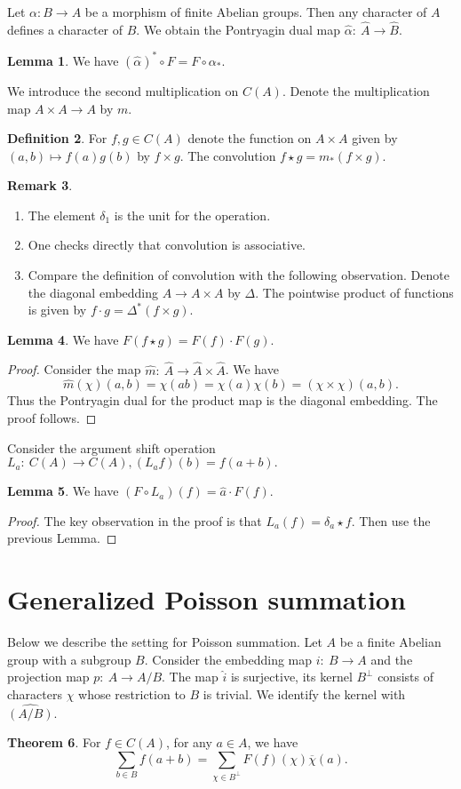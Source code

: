 \documentclass[11pt]{amsart}
\theoremstyle{definition}
\newtheorem{defi}{Definition}[section]
\newtheorem{rem}[defi]{Remark}
\newtheorem{lem}[defi]{Lemma}
\newtheorem{theo}[defi]{Theorem}
\begin{document}
Let $\alpha: B\to A$ be a morphism of finite Abelian groups. Then any character of $A$ defines a character of $B$. We obtain the Pontryagin dual map $\hat{\alpha}:\ \hat{A}\to \hat{B}$.
\begin{lem} We have $(\hat{\alpha})^*\circ F=F\circ \alpha_*$.
\end{lem}
We introduce the second multiplication on $C(A)$. Denote the multiplication map $A\times A\to A$ by $m$.
\begin{defi} For $f,g \in C(A)$ denote the function on $A\times A$ given by $(a,b)\mapsto f(a)g(b)$ by $f\times g$. The convolution $f\star g=m_*(f\times g)$.
\end{defi}
\begin{rem} 
\begin{enumerate}
\item The element $\delta_1$ is the unit for the operation. 
\item One checks directly that convolution is associative.
\item Compare the definition of convolution with the following observation. Denote the diagonal embedding $A\to A\times A$ by $\Delta$. The pointwise product of functions is given by $f\cdot g=\Delta^*(f\times g)$.
\end{enumerate}
\end{rem}
\begin{lem} We have $F(f\star g)=F(f)\cdot F(g)$.
\end{lem}
\begin{proof}
Consider the map $\hat{m}:\ \hat{A}\to \hat{A}\times \hat{A}$. We have
$$\hat{m}(\chi)(a,b)=\chi(ab)=\chi(a)\chi(b)=(\chi\times \chi)(a,b).$$ Thus the Pontryagin dual for the product map is the diagonal embedding. The proof follows.
\end{proof}
Consider the argument shift operation $L_a:\ C(A)\to C(A), (L_af)(b)=f(a+b).$
\begin{lem}
 We have $(F\circ L_a)(f)=\hat{a}\cdot F(f)$.   
\end{lem}
\begin{proof}
    The key observation in the proof is that $L_a(f)=\delta_a\star f$. Then use the previous Lemma.
\end{proof}

\section{Generalized Poisson summation}
Below we describe the setting for Poisson summation. Let $A$ be a finite Abelian group with a subgroup $B$. 
Consider the embedding map $i:\ B\to A$ and the projection map $p:\ A\to A/B$. The map $\hat{i}$ is surjective, its kernel $B^\perp$ consists of characters $\chi$ whose restriction to $B$ is trivial. We identify the kernel with $\widehat{(A/B)}$.
\begin{theo} For  $f\in C(A)$, for any $a\in A$, we have 
$$
\sum_{b\in B}f(a+b)=\sum_{\chi\in B^\perp}F(f)(\chi)\overline{\chi}(a).$$
\end{theo}
    
\end{document}
